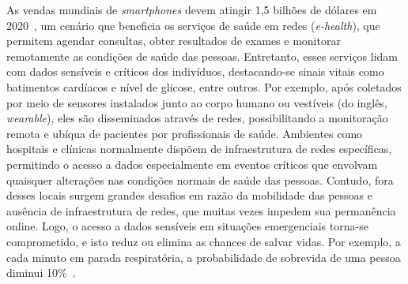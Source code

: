 \documentclass[12pt]{article}
\newcommand{\as}[1]{\textcolor{blue}{{\bf #1}}}
\newcommand{\al}[1]{\textcolor{brown}{{\bf #1}}}
\begin{document}
As
vendas mundiais de \textit{smartphones} devem atingir 1,5 bilhões de dólares em 2020~\cite{statista2019},
um cenário que beneficia os serviços de saúde em redes (\textit{e-health}), 
que permitem agendar consultas, obter resultados de exames e monitorar remotamente as condições de saúde das pessoas.
Entretanto,
esses serviços lidam com dados sensíveis e críticos dos indivíduos, destacando-se sinais vitais como batimentos cardíacos e nível de glicose, entre outros.
Por exemplo, após
coletados por meio de sensores instalados junto ao corpo humano ou vestíveis (do inglês, \textit{wearable}), eles são disseminados através de redes, possibilitando a monitoração remota e ubíqua de pacientes por profissionais de saúde. Ambientes  %
como hospitais e clínicas normalmente dispõem de infraestrutura de redes 
específicas, 
permitindo  %
o acesso a
dados especialmente
em  %
eventos
críticos
que 
envolvam quaisquer 
alterações nas condições normais de saúde das pessoas.
Contudo,
fora desses locais 
surgem grandes desafios 
em razão da 
mobilidade das pessoas e 
ausência 
de infraestrutura de redes,
que muitas vezes impedem
sua permanência
online.
Logo, o acesso a dados sensíveis em situações emergenciais torna-se comprometido, e isto reduz ou elimina as chances de salvar vidas. Por exemplo, a cada minuto em parada respiratória, a probabilidade de sobrevida de uma pessoa diminui 10\%~\cite{pazin2003parada}.

\end{document}
